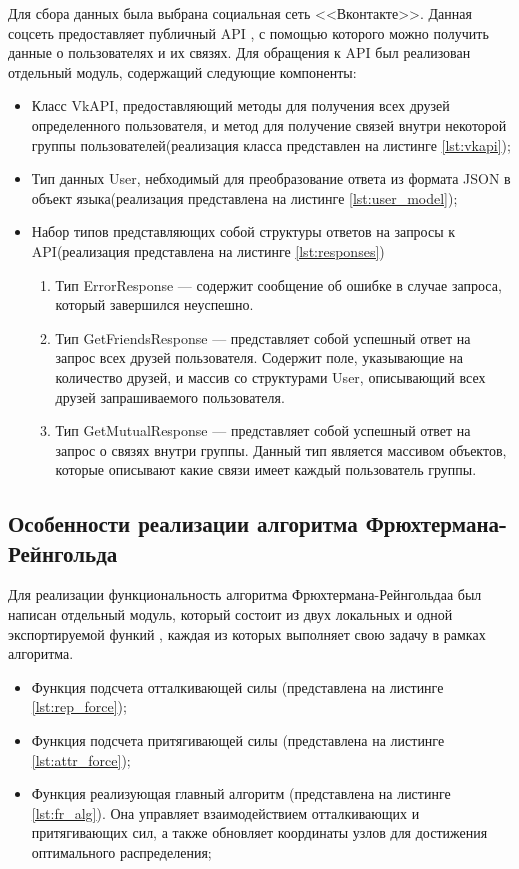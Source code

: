 \documentclass[14pt, russian]{scrartcl}
\begin{document}
Для сбора данных была выбрана социальная сеть <<Вконтакте>>. Данная соцсеть предоставляет публичный API \cite{VKAPI}, с помощью которого можно получить данные о пользователях и их связях. Для обращения к API был реализован отдельный модуль, содержащий следующие компоненты:

\begin{itemize}
  \item Класс VkAPI, предоставляющий методы для получения всех друзей определенного пользователя, и метод для получение связей внутри некоторой группы пользователей(реализация класса представлен на листинге \ref{lst:vkapi});
  \item Тип данных User, небходимый для преобразование ответа из формата JSON в объект языка(реализация представлена на листинге \ref{lst:user_model});
  \item Набор типов представляющих собой структуры ответов на запросы к API(реализация представлена на листинге \ref{lst:responses})
    \begin{enumerate}
      \item Тип ErrorResponse --- содержит сообщение об ошибке в случае запроса, который завершился неуспешно.
      \item Тип GetFriendsResponse --- представляет собой успешный ответ на запрос всех друзей пользователя. Содержит поле, указывающие на количество друзей, и массив со структурами User, описывающий всех друзей запрашиваемого пользователя.
      \item Тип GetMutualResponse --- представляет собой успешный ответ на запрос о связях внутри группы. Данный тип является массивом объектов, которые описывают какие связи имеет каждый пользователь группы.
    \end{enumerate}
  
\end{itemize}


\subsection{Особенности реализации алгоритма Фрюхтермана-Рейнгольда}

Для реализации функциональность алгоритма Фрюхтермана-Рейнгольдаа был написан отдельный модуль, который состоит из двух локальных и одной экспортируемой функий
, каждая из которых выполняет свою задачу в рамках алгоритма.

\begin{itemize}
  \item Функция подсчета отталкивающей силы (представлена на листинге \ref{lst:rep_force});
  \item Функция подсчета притягивающей силы (представлена на листинге \ref{lst:attr_force});
  \item Функция реализующая главный алгоритм (представлена на листинге \ref{lst:fr_alg}). Она управляет взаимодействием отталкивающих и притягивающих сил, а также обновляет координаты узлов для достижения оптимального распределения;
    
\end{itemize}
\end{document}
